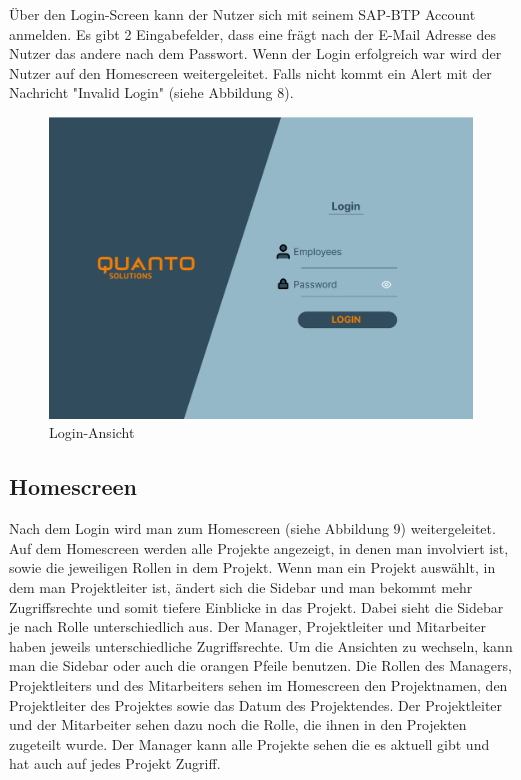 \documentclass{article}
\begin{document}
Über den Login-Screen kann der Nutzer sich mit seinem SAP-BTP Account anmelden. Es gibt 2 Eingabefelder, dass eine frägt nach der E-Mail Adresse des Nutzer das andere nach dem Passwort.
Wenn der Login erfolgreich war wird der Nutzer auf den Homescreen weitergeleitet. Falls nicht kommt ein Alert mit der Nachricht "Invalid Login" (siehe Abbildung 8).

\begin{figure}[h]
    \includegraphics[height= 0.5\textwidth,width= \textwidth]{images/Login.png}
    \caption{Login-Ansicht}
    \label{fig:beispiel}
\end{figure}

\subsection{Homescreen}
Nach dem Login wird man zum Homescreen (siehe Abbildung 9) weitergeleitet. Auf
dem Homescreen werden alle Projekte angezeigt, in denen man involviert ist,
sowie die jeweiligen Rollen in dem Projekt. Wenn man ein Projekt auswählt, in
dem man Projektleiter ist, ändert sich die Sidebar und man bekommt mehr
Zugriffsrechte und somit tiefere Einblicke in das Projekt. Dabei sieht die
Sidebar je nach Rolle unterschiedlich aus. Der Manager, Projektleiter und
Mitarbeiter haben jeweils unterschiedliche Zugriffsrechte. Um die Ansichten zu
wechseln, kann man die Sidebar oder auch die orangen Pfeile benutzen. Die
Rollen des Managers, Projektleiters und des Mitarbeiters sehen im Homescreen
den Projektnamen, den Projektleiter des Projektes sowie das Datum des
Projektendes. Der Projektleiter und der Mitarbeiter sehen dazu noch die Rolle,
die ihnen in den Projekten zugeteilt wurde. Der Manager kann alle Projekte sehen
die es aktuell gibt und hat auch auf jedes Projekt Zugriff.
\end{document}
